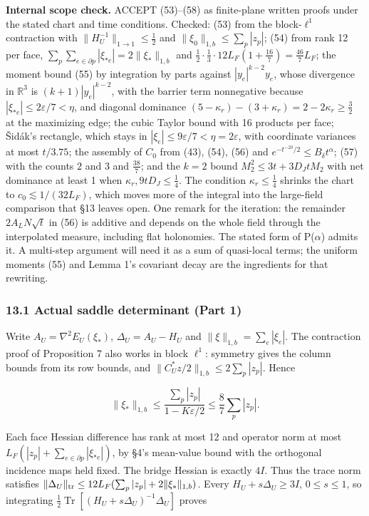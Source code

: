 \documentclass[11pt,a4paper]{article}
\begin{document}
\textbf{Internal scope check.} ACCEPT (53)--(58) as finite-plane written
proofs under the stated chart and time conditions. Checked: (53) from
the block-\(\ell^1\) contraction with \(\|H_U^{-1}\|_{1\to1}\le\frac12\)
and \(\|\xi_0\|_{1,b}\le\sum_p|z_p|\); (54) from rank 12 per face,
\(\sum_p\sum_{e\in\partial p}|\xi_{*e}|=2\|\xi_*\|_{1,b}\) and
\(\frac12\cdot\frac13\cdot12L_F(1+\frac{16}7)=\frac{46}7L_F\); the
moment bound (55) by integration by parts against \(|y_e|^{k-2}y_e\),
whose divergence in \(\mathbb R^3\) is \((k+1)|y_e|^{k-2}\), with the
barrier term nonnegative because \(|\xi_{*e}|\le2\varepsilon/7<\eta\),
and diagonal dominance
\((5-\kappa_r)-(3+\kappa_r)=2-2\kappa_r\ge\frac32\) at the maximizing
edge; the cubic Taylor bound with 16 products per face; Šidák's
rectangle, which stays in
\(|\xi_e|\le9\varepsilon/7<\eta=2\varepsilon\), with coordinate
variances at most \(t/3.75\); the assembly of \(C_0\) from (43), (54),
(56) and \(e^{-t^{-2\delta}/2}\le B_\delta t^\alpha\); (57) with the
counts \(2\) and \(3\) and \(\frac{38}7\); and the \(k=2\) bound
\(M_2^2\le3t+3D_JtM_2\) with net dominance at least 1 when
\(\kappa_r,9tD_J\le\frac14\). The condition \(\kappa_r\le\frac14\)
shrinks the chart to \(c_0\lesssim1/(32L_F)\), which moves more of the
integral into the large-field comparison that §13 leaves open. One
remark for the iteration: the remainder \(2A_LN\sqrt t\) in (56) is
additive and depends on the whole field through the interpolated
measure, including flat holonomies. The stated form of P(\(\alpha\))
admits it. A multi-step argument will need it as a sum of quasi-local
terms; the uniform moments (55) and Lemma 1's covariant decay are the
ingredients for that rewriting.

\hypertarget{actual-saddle-determinant-part-1}{%
\subsubsection{13.1 Actual saddle determinant (Part
1)}\label{actual-saddle-determinant-part-1}}

Write \(A_U=\nabla^2E_U(\xi_*)\), \(\Delta_U=A_U-H_U\) and
\(\|\xi\|_{1,b}=\sum_e|\xi_e|\). The contraction proof of Proposition 7
also works in block \(\ell^1\): symmetry gives the column bounds from
its row bounds, and \(\|C_U^*z/2\|_{1,b}\le2\sum_p|z_p|\). Hence

\[\|\xi_*\|_{1,b}\le\frac{\sum_p|z_p|}{1-K\varepsilon/2}
\le\frac87\sum_p|z_p|.\tag{53}\]

Each face Hessian difference has rank at most 12 and operator norm at
most \(L_F(|z_p|+\sum_{e\in\partial p}|\xi_{*e}|)\), by §4's mean-value
bound with the orthogonal incidence maps held fixed. The bridge Hessian
is exactly \(4I\). Thus the trace norm satisfies
\(\|\Delta_U\|_{\rm tr}\le12L_F(\sum_p|z_p|+2\|\xi_*\|_{1,b})\). Every
\(H_U+s\Delta_U\ge3I\), \(0\le s\le1\), so integrating
\(\frac12\operatorname{Tr}[(H_U+s\Delta_U)^{-1}\Delta_U]\) proves
\end{document}
